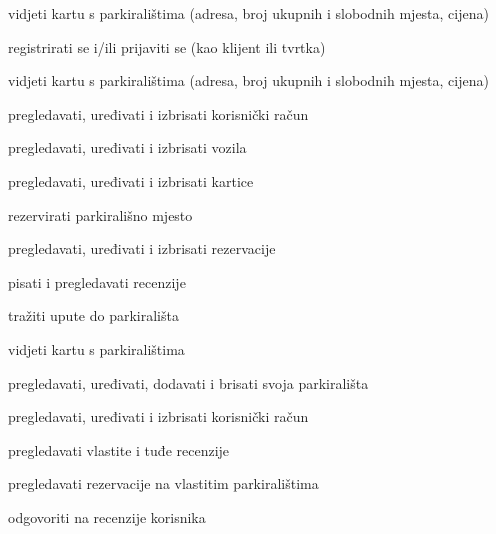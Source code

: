 \begin{packed_enum}
	\item  {}
	
	\begin{packed_enum}
		
		\item vidjeti kartu s parkiralištima (adresa, broj ukupnih i slobodnih mjesta, cijena)
		\item registrirati se i/ili prijaviti se (kao klijent ili tvrtka)
		
	\end{packed_enum}
	
	\item  {}
	
	\begin{packed_enum}
		
		\item vidjeti kartu s parkiralištima (adresa, broj ukupnih i slobodnih mjesta, cijena)
		\item pregledavati, uređivati i izbrisati korisnički račun
		\item pregledavati, uređivati i izbrisati vozila
		\item pregledavati, uređivati i izbrisati kartice
		\item rezervirati parkirališno mjesto
		\item pregledavati, uređivati i izbrisati rezervacije
		\item pisati i pregledavati  recenzije
		\item tražiti upute do parkirališta
		
	\end{packed_enum}
	
	
	\item  {}
	
	\begin{packed_enum}
		
		\item vidjeti kartu s parkiralištima
		\item pregledavati, uređivati, dodavati i brisati svoja parkirališta
		\item pregledavati, uređivati i izbrisati korisnički račun
		\item pregledavati vlastite i tuđe recenzije
		\item pregledavati rezervacije na vlastitim parkiralištima
		\item odgovoriti na recenzije korisnika
		

\end{packed_enum}
\end{packed_enum}
